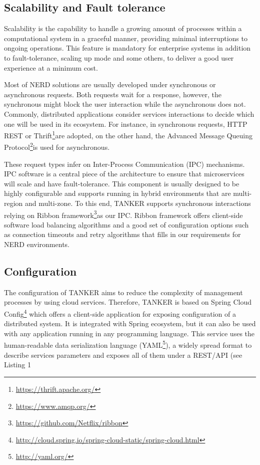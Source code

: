 \documentclass{sig-alternate}
\begin{document}
\subsection{Scalability and Fault tolerance}

Scalability is the capability to handle a growing amount of processes within a computational system in a graceful manner, providing minimal interruptions to ongoing operations. This feature is mandatory for enterprise systems in addition to fault-tolerance, scaling up mode and some others, to deliver a good user experience at a minimum cost.

Most of NERD solutions are usually developed under synchronous or asynchronous requests. Both requests wait for a response, however, the synchronous might block the user interaction while the asynchronous does not. Commonly, distributed applications consider services interactions to decide which one will be used in its ecosystem. For instance, in synchronous requests, HTTP REST or Thrift\footnote{\url{https://thrift.apache.org/}}are adopted, on the other hand, the Advanced Message Queuing Protocol\footnote{\url{https://www.amqp.org/}}is used for asynchronous.

These request types infer on Inter-Process Communication (IPC) mechanisms. IPC software is a central piece of the architecture to ensure that microservices will scale and have fault-tolerance. This component is usually designed to be highly configurable and supports running in hybrid environments that are multi-region and multi-zone. To this end, TANKER supports synchronous interactions relying on Ribbon framework\footnote{\url{https://github.com/Netflix/ribbon}}as our IPC. Ribbon framework offers client-side software load balancing algorithms and a good set of configuration options such as connection timeouts and retry algorithms that fills in our requirements for NERD environments.

\subsection{Configuration}

The configuration of TANKER aims to reduce the complexity of management processes by using cloud services. Therefore, TANKER is based on Spring Cloud Config\footnote{\url{http://cloud.spring.io/spring-cloud-static/spring-cloud.html}} which offers a client-side application for exposing configuration of a distributed system. It is integrated with Spring ecosystem, but it can also be used with any application running in any programming language. This service uses the human-readable data serialization language (YAML\footnote{\url{http://yaml.org/}}), a widely spread format to describe services parameters and exposes all of them under a REST/API (see Listing 1
\end{document}
